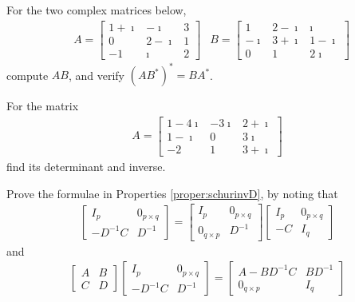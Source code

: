\begin{Exercise}
For the two complex matrices below,
\begin{align*}
& A=
\begin{bmatrix}
1+\imath & -\imath & 3 \\
0 & 2-\imath & 1 \\
-1 & \imath & 2
\end{bmatrix}
& B=
\begin{bmatrix}
1 & 2-\imath & \imath \\
-\imath & 3+\imath & 1-\imath \\
0 & 1 & 2\imath
\end{bmatrix}
\end{align*}
compute $AB$, and verify $(AB^*)^* = BA^*$.
\end{Exercise}

\begin{Exercise}
For the matrix
\begin{align*}
A=
\begin{bmatrix}
1-4\imath & -3\imath & 2+\imath \\
1-\imath & 0 & 3\imath \\
-2 & 1 & 3+\imath
\end{bmatrix}    
\end{align*}
find its determinant and inverse.
\end{Exercise}

\begin{Exercise}
\label{ex:schurinvD}
Prove the formulae in Properties \ref{proper:schurinvD}, by noting that
\begin{align*}
\begin{bmatrix}
I_p & 0_{p \times q} \\
-D^{-1}C & D^{-1}
\end{bmatrix}  
=
\begin{bmatrix}
I_p & 0_{p \times q} \\
0_{q \times p} & D^{-1}
\end{bmatrix} 
\begin{bmatrix}
I_p & 0_{p \times q} \\
-C & I_q
\end{bmatrix} 
\end{align*}
and
\begin{align*}
\begin{bmatrix}
A & B \\
C & D
\end{bmatrix}
\begin{bmatrix}
I_p & 0_{p \times q} \\
-D^{-1}C & D^{-1}
\end{bmatrix} =
\begin{bmatrix}
A - BD^{-1}C & BD^{-1} \\
0_{q \times p} & I_q
\end{bmatrix}
\end{align*}
\end{Exercise}

